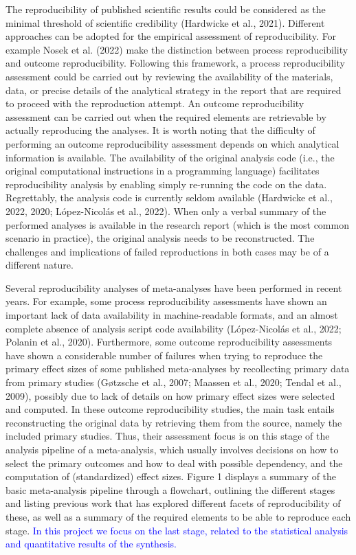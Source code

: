 \documentclass[
  ,man,floatsintext]{apa6}
\begin{document}
The reproducibility of published scientific results could be considered as the minimal threshold of scientific credibility (Hardwicke et al., 2021). Different approaches can be adopted for the empirical assessment of reproducibility. For example Nosek et al. (2022) make the distinction between process reproducibility and outcome reproducibility. Following this framework, a process reproducibility assessment could be carried out by reviewing the availability of the materials, data, or precise details of the analytical strategy in the report that are required to proceed with the reproduction attempt. An outcome reproducibility assessment can be carried out when the required elements are retrievable by actually reproducing the analyses. It is worth noting that the difficulty of performing an outcome reproducibility assessment depends on which analytical information is available. The availability of the original analysis code (i.e., the original computational instructions in a programming language) facilitates reproducibility analysis by enabling simply re-running the code on the data. Regrettably, the analysis code is currently seldom available (Hardwicke et al., 2022, 2020; López-Nicolás et al., 2022). When only a verbal summary of the performed analyses is available in the research report (which is the most common scenario in practice), the original analysis needs to be reconstructed. The challenges and implications of failed reproductions in both cases may be of a different nature.

Several reproducibility analyses of meta-analyses have been performed in recent years. For example, some process reproducibility assessments have shown an important lack of data availability in machine-readable formats, and an almost complete absence of analysis script code availability (López-Nicolás et al., 2022; Polanin et al., 2020). Furthermore, some outcome reproducibility assessments have shown a considerable number of failures when trying to reproduce the primary effect sizes of some published meta-analyses by recollecting primary data from primary studies (Gøtzsche et al., 2007; Maassen et al., 2020; Tendal et al., 2009), possibly due to lack of details on how primary effect sizes were selected and computed. In these outcome reproducibility studies, the main task entails reconstructing the original data by retrieving them from the source, namely the included primary studies. Thus, their assessment focus is on this stage of the analysis pipeline of a meta-analysis, which usually involves decisions on how to select the primary outcomes and how to deal with possible dependency, and the computation of (standardized) effect sizes. Figure 1 displays a summary of the basic meta-analysis pipeline through a flowchart, outlining the different stages and listing previous work that has explored different facets of reproducibility of these, as well as a summary of the required elements to be able to reproduce each stage. \textcolor{blue}{In this project we focus on the last stage, related to the statistical analysis and quantitative results of the synthesis.}
\end{document}
